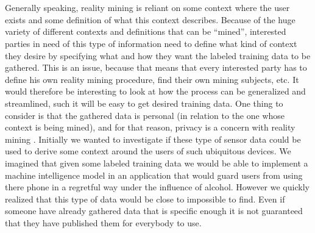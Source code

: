 \\\\
Generally speaking, reality mining is reliant on some context where the user exists and some definition of what this context describes. Because of the huge variety of different contexts and definitions that can be ``mined'', interested parties in need of this type of information need to define what kind of context they desire by specifying what and how they want the labeled training data to be gathered. This is an issue, because that means that every interested party has to define his own reality mining procedure, find their own mining subjects, etc. It would therefore be interesting to look at how the process can be generalized and streamlined, such it will be easy to get desired training data. One thing to consider is that the gathered data is personal (in relation to the one whose context is being mined), and for that reason, privacy is a concern with reality mining \parencite{madan2009_reality_mining_privacy}. 
Initially we wanted to investigate if these type of sensor data could be used to derive some context around the users of such ubiquitous devices. We imagined that given some labeled training data we would be able to implement a machine intelligence model in an application that would guard users from using there phone in a regretful way under the influence of alcohol. However we quickly realized that this type of data would be close to impossible to find. Even if someone have already gathered data that is specific enough it is not guaranteed that they have published them for everybody to use.

